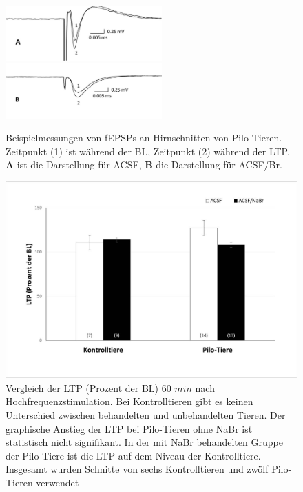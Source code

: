 \documentclass[a4paper,11pt]{report}
\begin{document}
{\begin{figure}
\begin{center}
\includegraphics[width=6cm]{Abbildungen/feld_samples/field_p_c}
\includegraphics[width=6cm]{Abbildungen/feld_samples/field_p_br}
\caption{Beispielmessungen von fEPSPs an Hirnschnitten von Pilo-Tieren. Zeitpunkt (1) ist während der BL, Zeitpunkt (2) während der LTP. \textbf{A} ist die Darstellung für ACSF, \textbf{B} die Darstellung für ACSF/Br.}
\end{center}
\end{figure}

\begin{figure}[H]
\begin{center}
\includegraphics[width=13cm]{Abbildungen/feld_samples/ltp_diagramm.jpg}
\caption{Vergleich der LTP (Prozent der BL) 60 $min$ nach Hochfrequenzstimulation. Bei Kontrolltieren gibt es keinen Unterschied zwischen behandelten und unbehandelten Tieren. Der graphische Anstieg der LTP bei Pilo-Tieren ohne NaBr ist statistisch nicht signifikant. In der mit NaBr behandelten Gruppe der Pilo-Tiere ist die LTP auf dem Niveau der Kontrolltiere. Insgesamt wurden Schnitte von sechs Kontrolltieren und zwölf Pilo-Tieren verwendet}  
\end{center}
\end{figure}

}
\end{document}
